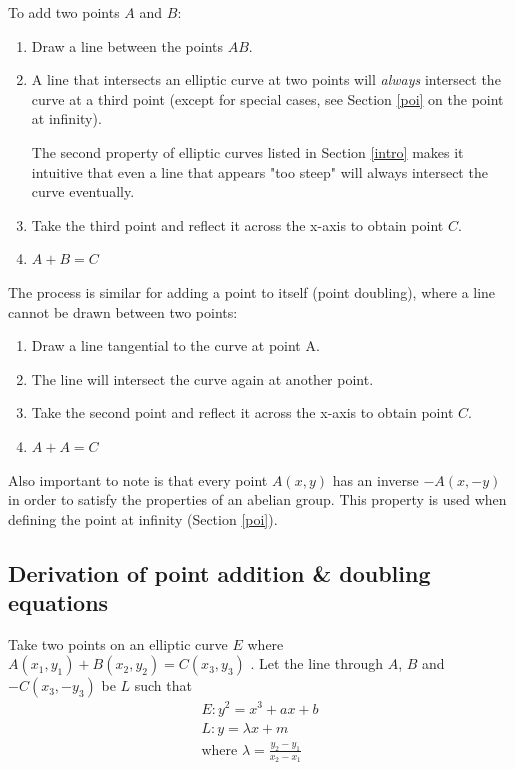 \documentclass[a4paper]{article}
\begin{document}
To add two points $A$ and $B$: 
\begin{enumerate}
    \item Draw a line between the points $AB$.
    \item A line that intersects an elliptic curve at two points will \textit{always} intersect the curve at a third point (except for special cases, see Section \ref{poi} on the point at infinity).
    
    The second property of elliptic curves listed in Section \ref{intro} makes it intuitive that even a line that appears "too steep" will always intersect the curve eventually.
    \item Take the third point and reflect it across the x-axis to obtain point $C$.
    \item $A + B = C$
\end{enumerate}

The process is similar for adding a point to itself (point doubling), where a line cannot be drawn between two points:
\begin{enumerate}
    \item Draw a line tangential to the curve at point A.
    \item The line will intersect the curve again at another point.
    \item Take the second point and reflect it across the x-axis to obtain point $C$.
    \item $A + A = C$
\end{enumerate}

Also important to note is that every point $A(x, y)$ has an inverse $-A(x, -y)$ in order to satisfy the properties of an abelian group. This property is used when defining the point at infinity (Section \ref{poi}).

\subsection{Derivation of point addition \& doubling equations}\label{proof}

Take two points on an elliptic curve $E$ where $A(x_1, y_1) + B(x_2, y_2) = C(x_3, y_3)$ . Let the line through $A$, $B$ and $-C(x_3, -y_3)$ be $L$ such that
\begin{gather*}
    E: y^2 = x^3 + ax + b \\
    L: y = \lambda x + m \\
    \text{where } \lambda = \frac{y_2-y_1}{x_2-x_1}
\end{gather*}
\end{document}
